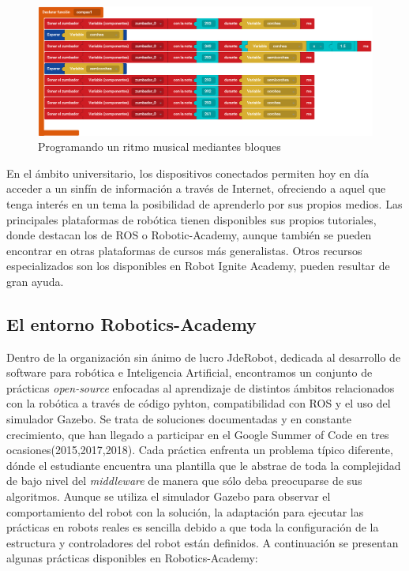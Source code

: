 \documentclass[12pt,spanish,chapterprefix, numbers=noenddot]{book}
\numberwithin{equation}{section}
\numberwithin{figure}{section}
\begin{document}
    \begin{figure}[h!]
    \centering
    \includegraphics[width=12cm]{Figs/compas_bitbloq.png}
    \par
    \caption{\label{fig:bitbloq}Programando un ritmo musical mediantes bloques}
    \end{figure}

En el ámbito universitario, los dispositivos conectados permiten hoy en día acceder a un sinfín de información a través de Internet, ofreciendo a aquel que tenga interés en un tema la posibilidad de aprenderlo por sus propios medios. 
Las principales plataformas de robótica tienen disponibles sus propios tutoriales, donde destacan los de ROS o Robotic-Academy, aunque también se pueden encontrar en otras plataformas de cursos más generalistas. Otros recursos especializados son los disponibles en Robot Ignite Academy, pueden resultar de gran ayuda. 

\subsection{El entorno Robotics-Academy}
Dentro de la organización sin ánimo de lucro JdeRobot\cite{jderobot}, dedicada al desarrollo de software para robótica e Inteligencia Artificial, encontramos un conjunto de prácticas \textit{open-source} enfocadas al aprendizaje de distintos ámbitos relacionados con la robótica a través de código pyhton, compatibilidad con ROS y el uso del simulador Gazebo. Se trata de soluciones documentadas y en constante crecimiento, que han llegado a participar en el Google Summer of Code en tres ocasiones(2015,2017,2018).
Cada práctica enfrenta un problema típico diferente, dónde el estudiante encuentra una plantilla que le abstrae de toda la complejidad de bajo nivel del \textit{middleware} de manera que sólo deba preocuparse de sus algoritmos. 
Aunque se utiliza el simulador Gazebo para observar el comportamiento del robot con la solución, la adaptación para ejecutar las prácticas en robots reales es sencilla debido a que toda la configuración de la estructura y controladores del robot están definidos. A continuación se presentan algunas prácticas disponibles en Robotics-Academy:
\end{document}
